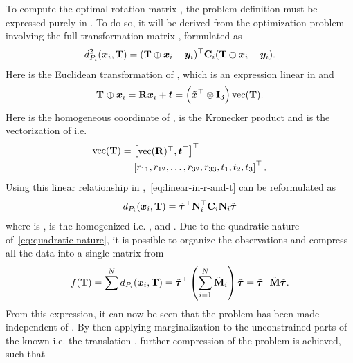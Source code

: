 To compute the optimal rotation matrix \tf[R]{}{}, the problem definition must be expressed purely in \tf[R]{}{}. To do so, it will be derived from the optimization problem involving the full transformation matrix \tf[T]{}{}, formulated as
%
\begin{equation}\label{eq:linear-in-r-and-t}
	d_{P_i}^2(\vec{x}_i, \mat{T})=(\mat{T}\oplus \vec{x}_i - \vec{y}_i)^\T\mat{C}_i (\mat{T}\oplus \vec{x}_i - \vec{y}_i).
\end{equation}
Here  is the Euclidean transformation of , which is an expression linear in \tf[R]{}{} and 
%
\begin{equation}
	\tf[T]{}{} \oplus \vec{x}_i = \mat{R}\vec{x}_i + \vec{t} = \left( \tilde{\vec{x}}^\T \otimes \mat{I}_3\right) \text{vec}(\mat{T}).
\end{equation}
Here  is the homogeneous coordinate of , \mvar{\otimes} is the Kronecker product and  is the vectorization of  i.e.
%
\begin{align}
	\text{vec}(\mat{T}) &= \rvec{\text{vec}(\mat{R})^\T, \vec{t}^\T}^\T \\
	&= \rvec{r_{11},r_{12},\dots,r_{32},r_{33},t_{1},t_{2},t_{3}}^\T.
\end{align}
Using this linear relationship in ,~\eqref{eq:linear-in-r-and-t} can be reformulated as 
%
\begin{equation}\label{eq:quadratic-nature}
	d_{P_i}(\vec{x}_i,\mat{T})=\tilde{\vec{\tau}}^\T \mat{N}_i^\T \mat{C}_i \mat{N}_i \tilde{\vec{\tau}}
\end{equation}
where \mvar{\vec{\tau}} is , \mvar{\tilde{\vec{\tau}}} is the homogenized  i.e. , and . Due to the quadratic nature of~\eqref{eq:quadratic-nature}, it is possible to organize the observations and compress all the data into a single matrix  from 
%
\begin{equation}
	f(\mat{T})=\sum^N d_{P_i}(\vec{x}_i,\mat{T})=\tilde{\vec{\tau}}^\T \left( \sum^N_{i=1} \tilde{\mat{M}}_i \right) \tilde{\vec{\tau}} = \tilde{\vec{\tau}}^\T \tilde{\mat{M}} \tilde{\vec{\tau}}.
\end{equation}
From this expression, it can now be seen that the problem has been made independent of . By then applying marginalization to the unconstrained parts of the known  i.e. the translation , further compression of the problem is achieved, such that
